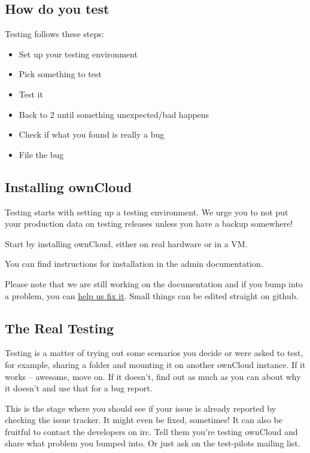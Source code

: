\documentclass[letterpaper,10pt,english]{sphinxmanual}
\begin{document}
\subsection{How do you test}
\label{testing/index:how-do-you-test}
Testing follows these steps:
\begin{itemize}
\item {} 
Set up your testing environment

\item {} 
Pick something to test

\item {} 
Test it

\item {} 
Back to 2 until something unexpected/bad happens

\item {} 
Check if what you found is really a bug

\item {} 
File the bug

\end{itemize}


\subsection{Installing ownCloud}
\label{testing/index:installing-owncloud}
Testing starts with setting up a testing environment. We urge you to not put your production data on testing
releases unless you have a backup somewhere!

Start by installing ownCloud, either on real hardware or in a VM.

You can find instructions for installation in the admin documentation.

Please note that we are still working on the documentation and if you bump into a problem, you can
\href{https://github.com/owncloud/documentation}{help us fix it}. Small things can be edited straight on github.


\subsection{The Real Testing}
\label{testing/index:the-real-testing}
Testing is a matter of trying out some scenarios you decide or were asked to test, for example, sharing a folder
and mounting it on another ownCloud instance. If it works – awesome, move on. If it doesn't, find out
as much as you can about why it doesn't and use that for a bug report.

This is the stage where you should see if your issue is already reported by checking the issue
tracker. It might even be fixed, sometimes! It can also be fruitful to contact the
developers on irc. Tell them you're testing ownCloud
and share what problem you bumped into. Or just ask on the test-pilots mailing list.
\end{document}
